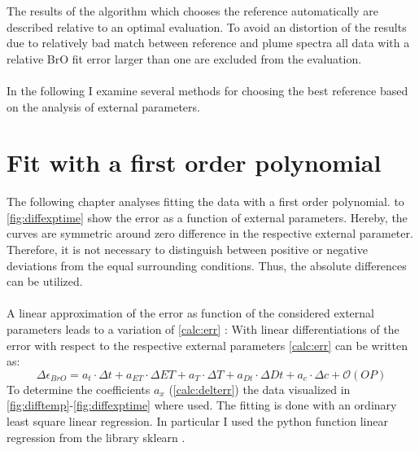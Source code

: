 \documentclass  [
  paper    = a4,
  BCOR     = 10mm,
  twoside,
  fontsize = 12pt,
  fleqn,
  toc      = bibnumbered,
  toc      = listofnumbered,
  numbers  = noendperiod,
  headings = normal,
  listof   = leveldown,
  version  = 3.03
]                                       {scrreprt}
\begin{document}
	The results of the algorithm which chooses the reference automatically are described relative to an optimal evaluation. To avoid an distortion of the results due to relatively bad match between reference and plume spectra all data with a relative BrO fit error larger than one are excluded from the evaluation.\\
	\\
	In the following I examine several methods for choosing the best reference based on the analysis of external parameters. 
	
\section{Fit with a first order polynomial}
	The following chapter analyses fitting the data with a first order polynomial.  to \cref{fig:diffexptime} show the   error as a function of external parameters. Hereby, the curves are symmetric around zero difference in the respective external parameter. Therefore, it is not necessary to distinguish between positive or negative deviations from the equal surrounding conditions. Thus, the absolute differences can be utilized.\\
	\\
	A linear approximation of the   error as function of the considered external parameters leads to a variation of  \cref{calc:err} :
	With linear differentiations of the   error with respect to the respective external parameters \cref{calc:err} can be written as:	
	\begin{equation}
		\Delta \epsilon_{BrO} = a_{t}\cdot\Delta t+a_{ET}\cdot\Delta ET+a_{T}\cdot\Delta T+a_{Dt}\cdot\Delta Dt +a_{c}\cdot\Delta c + \mathcal{O}\left(OP\right)
		\label{calc:delterr}
	\end{equation}
	To determine the coefficients $a_{x}$ (\cref{calc:delterr}) the data visualized in \cref{fig:difftemp}-\ref{fig:diffexptime} where used.  The fitting is done with an ordinary least square linear regression. In particular I used the python function linear regression from the library sklearn \citep{SKlearn}. \\
	
\end{document}
